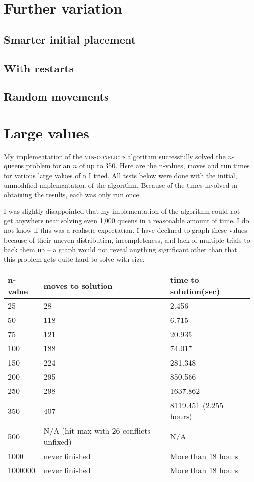 \documentclass{article}
\begin{document}
\begin{doublespace}
\section{Further variation}
\subsection{Smarter initial placement}

\subsection{With restarts}

\subsection{Random movements}

\section{Large values}
My implementation of the \textsc{min-conflicts} algorithm successfully solved the $n$-queens problem for an $n$ of up to 350. Here are the n-values, moves and run times for various large values of n I tried. All tests below were done with the initial, unmodified implementation of the algorithm. Because of the times involved in obtaining the results, each was only run once.

I was slightly disappointed that my implementation of the algorithm could not get anywhere near solving even 1,000 queens in a reasonable amount of time. I do not know if this was a realistic expectation. I have declined to graph these values because of their uneven distribution, incompleteness, and lack of multiple trials to back them up -- a graph would not reveal anything significant other than that this problem gets quite hard to solve with size.\\

\begin{center}
\begin{tabular}{|l | l | l|}
\hline
	n-value & moves to solution & time to solution(sec) \\ \hline
	25 & 28 & 2.456 \\ \hline
	50 & 118 & 6.715 \\ \hline
	75 & 121 & 20.935 \\ \hline
	100 & 188 & 74.017 \\ \hline
	150 & 224 & 281.348 \\ \hline
	200 & 295 & 850.566 \\ \hline
	250 & 298 & 1637.862 \\ \hline
	350 & 407 & 8119.451 (2.255 hours) \\ \hline
	500 & N/A (hit max with 26 conflicts unfixed) & N/A \\ \hline
	1000 & never finished & More than 18 hours \\ \hline
	1000000 & never finished & More than 18 hours \\
\hline
\end{tabular}
\end{center}


\end{doublespace}
\end{document}
